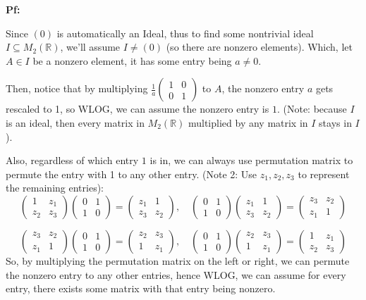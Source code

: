 \documentclass{article}
\begin{document}
\textbf{Pf:}

Since $(0)$ is automatically an Ideal, thus to find some nontrivial ideal $I\subseteq M_2(\mathbb{R})$, we'll assume $I\neq (0)$ (so there are nonzero elements).
Which, let $A\in I$ be a nonzero element, it has some entry being $a\neq 0$. 

\hfill

Then, notice that by multiplying $\frac{1}{a}\begin{pmatrix}
    1&0\\0&1
\end{pmatrix}$ to $A$, the nonzero entry $a$ gets rescaled to 1, so WLOG, we can assume the nonzero entry is $1$. (Note: because $I$ is an ideal, then every matrix in $M_2(\mathbb{R})$ multiplied by any matrix in $I$ stays in $I$).

Also, regardless of which entry $1$ is in, we can always use permutation matrix to permute the entry with 1 to any other entry. (Note 2: Use $z_1,z_2,z_3$ to represent the remaining entries):
$$\begin{pmatrix}
    1& z_1\\z_2&z_3
\end{pmatrix}\begin{pmatrix}
    0&1\\1&0
\end{pmatrix}=\begin{pmatrix}
    z_1&1\\z_3&z_2
\end{pmatrix},\quad \begin{pmatrix}
    0&1\\1&0
\end{pmatrix}\begin{pmatrix}
    z_1&1\\z_3&z_2
\end{pmatrix}=\begin{pmatrix}
    z_3&z_2\\
    z_1&1
\end{pmatrix}$$

$$\begin{pmatrix}
    z_3&z_2\\
    z_1&1
\end{pmatrix}\begin{pmatrix}
    0&1\\1&0
\end{pmatrix}=\begin{pmatrix}
    z_2&z_3\\
    1&z_1
\end{pmatrix},\quad \begin{pmatrix}
    0&1\\1&0
\end{pmatrix}\begin{pmatrix}
    z_2&z_3\\
    1&z_1
\end{pmatrix}=\begin{pmatrix}
    1&z_1\\
    z_2&z_3
\end{pmatrix}$$
So, by multiplying the permutation matrix on the left or right, we can permute the nonzero entry to any other entries,
hence WLOG, we can assume for every entry, there exists some matrix with that entry being nonzero.
\end{document}
